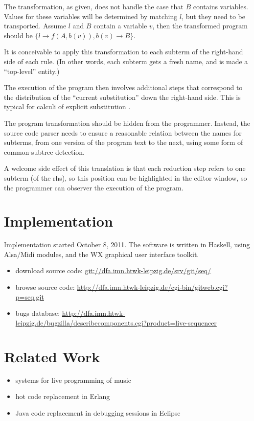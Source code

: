 \documentclass[a4paper]{easychair}
\begin{document}
The transformation, as given, does not handle the case
that $B$ contains variables. 
Values for these variables will be determined by matching $l$, 
but they need to be transported. 
Assume $l$ and $B$ contain a variable $v$,
then the transformed program should be $\{l \to f(A,b(v)), b(v) \to B\}$.

It is conceivable to apply this transformation
to each subterm of the right-hand side of each rule.
(In other words, each subterm gets a fresh name,
and is made a ``top-level'' entity.)

The execution of the program then involves additional steps
that correspond to the distribution of the ``current substitution''
down the right-hand side. This is typical for calculi
of explicit substitution \cite{DBLP:conf/popl/Lescanne94}.

The program transformation should be hidden from the programmer.
Instead, the source code parser needs to ensure a reasonable relation
between the names for subterms, from one version of the program text
to the next, using some form of common-subtree detection.

A welcome side effect of this translation is that
each reduction step refers to one subterm (of the rhs),
so this position can be highlighted in the editor window,
so the programmer can observer the execution of the program.

\section{Implementation}

Implementation started October 8, 2011.
The software is written in Haskell,
using Alsa/Midi modules,
and the WX graphical user interface toolkit.

\begin{itemize}
\item download source code: \url{git://dfa.imn.htwk-leipzig.de/srv/git/seq/}
\item browse source code: \url{http://dfa.imn.htwk-leipzig.de/cgi-bin/gitweb.cgi?p=seq.git}
\item bugs database: \url{http://dfa.imn.htwk-leipzig.de/bugzilla/describecomponents.cgi?product=live-sequencer}
\end{itemize}

\section{Related Work}

\begin{itemize}
\item systems for live programming of music
\item hot code replacement in Erlang
\item Java code replacement in debugging sessions in Eclipse
\end{itemize}



\end{document}
